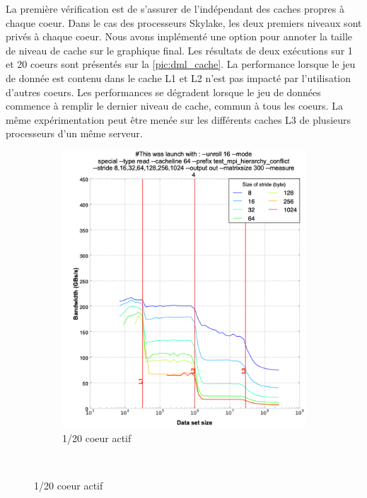         La première vérification est de s'assurer de l'indépendant des caches propres à chaque coeur. Dans le cas des processeurs Skylake, les deux premiers niveaux sont privés à chaque coeur. Nous avons implémenté une option pour annoter la taille de niveau de cache sur le graphique final. Les résultats de deux exécutions sur 1 et 20 coeurs sont présentés sur la \autoref{pic:dml_cache}. La performance lorsque le jeu de donnée est contenu dans le cache L1 et L2 n'est pas impacté par l'utilisation d'autres coeurs. Les performances se dégradent lorsque le jeu de données commence à remplir le dernier niveau de cache, commun à tous les coeurs. La même expérimentation peut être menée sur les différents caches L3 de plusieurs processeurs d'un même serveur.
        
        \begin{figure}
        \centering
            \begin{subfigure}[b]{0.47\linewidth}
            \includegraphics[width=\linewidth]{images/dml_cache_1core.png}
            \caption{1/20 coeur actif}
            \label{pic:dml_cache_1core}
            \end{subfigure}
        ~ %

\end{figure}

